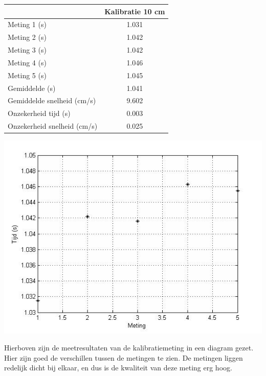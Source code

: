 \documentclass{report}
\begin{document}
\begin{center}
\begin{tabular}{| l| c|}
\hline
    & Kalibratie 10 cm \\
\hline
   Meting 1 (s) & 1.031 \\
\hline
   Meting 2 (s) & 1.042 \\
\hline
   Meting 3 (s) & 1.042 \\
\hline
   Meting 4 (s) & 1.046 \\
\hline
   Meting 5 (s) & 1.045 \\
\hline
   Gemiddelde (s) & 1.041 \\
\hline
   Gemiddelde snelheid (cm/s) & 9.602 \\
\hline
   Onzekerheid tijd (s) & 0.003 \\
\hline
   Onzekerheid snelheid (cm/s) & 0.025 \\
\hline
\end{tabular}
\end{center}
\begin{center}
\includegraphics[width=150mm] {grafiekmeetresultaten.jpg}
\end{center}
Hierboven zijn de meetresultaten van de kalibratiemeting in een diagram gezet. Hier zijn goed de verschillen tussen de metingen te zien. De metingen liggen redelijk dicht bij elkaar, en dus is de kwaliteit van deze meting erg hoog.
\end{document}
